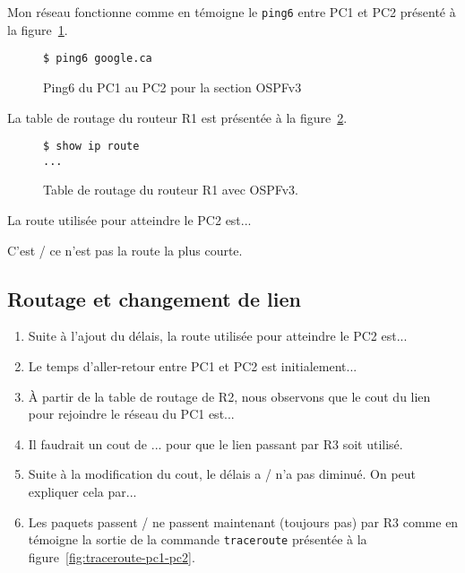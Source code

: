 \documentclass[]{article}
\begin{document}
Mon réseau fonctionne comme en témoigne le \texttt{ping6} entre PC1 et PC2 présenté à la figure~\ref{fig:ping6-pc1-pc2-ospfv2}.

\begin{figure} 
      \centering
      \begin{lstlisting}
$ ping6 google.ca
      \end{lstlisting}
      \caption[]{Ping6 du PC1 au PC2 pour la section OSPFv3}
      \label{fig:ping6-pc1-pc2-ospfv2}
\end{figure}

La table de routage du routeur R1 est présentée à la figure~\ref{fig:ospfv3-routes-r1}.

\begin{figure} 
      \centering
      \begin{lstlisting}
$ show ip route
...
      \end{lstlisting}
      \caption[]{Table de routage du routeur R1 avec OSPFv3.}
      \label{fig:ospfv3-routes-r1}
\end{figure}

La route utilisée pour atteindre le PC2 est...

C'est / ce n'est pas la route la plus courte.

\subsection*{Routage et changement de lien}

\begin{enumerate}
      \item  Suite à l'ajout du délais, la route utilisée pour atteindre le PC2 est...
      \item Le temps d'aller-retour entre PC1 et PC2 est initialement...
      \item À partir de la table de routage de R2, nous observons que le cout du lien pour rejoindre 
            le réseau du PC1 est...
      \item Il faudrait un cout de ... pour que le lien passant par R3 soit utilisé.
      \item Suite à la modification du cout, le délais a / n'a pas diminué. On peut expliquer cela par...
      \item Les paquets passent / ne passent maintenant (toujours pas) par R3 comme en témoigne la sortie
            de la commande \texttt{traceroute} présentée à la figure~\ref{fig:traceroute-pc1-pc2}.
\end{enumerate}
\end{document}
